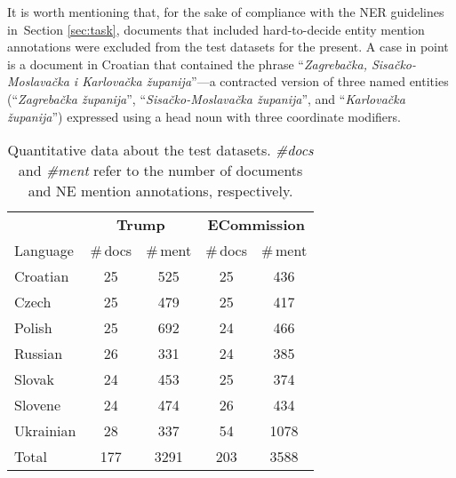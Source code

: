 \documentclass[11pt]{article}
\begin{document}
It is worth mentioning that, for the sake of compliance with the NER guidelines in~Section
\ref{sec:task}, documents that included hard-to-decide entity mention annotations were
excluded from the test datasets for the present.  {A case in point is a document in Croatian
  that contained the phrase ``\textit{Zagrebačka, Sisačko-Moslavačka i Karlovačka
    županija}''---a contracted version of three named entities (``\textit{Zagrebačka
    županija}'', ``\textit{Sisačko-Moslavačka županija}'', and ``\textit{Karlovačka
    županija}'') expressed using a head noun with three coordinate modifiers.}

\begin{table}
  \begin{center}
    \begin{footnotesize}
      \begin{tabular}{lcccc}
        \toprule 
        & \multicolumn{2}{c}{\textbf{{\sc Trump}}} & \multicolumn{2}{c}{\textbf{{\sc ECommission}}} \\
        \cmidrule(lr){2-3}
        \cmidrule(lr){4-5}
        Language &  \#\,docs & \#\,ment & \#\,docs & \#\,ment \\
        \midrule
        Croatian & 25 & 525 & 25 & 436 \\
        Czech & 25 & 479  & 25 & 417 \\
        Polish & 25 & 692  & 24 & 466 \\
        Russian & 26 & 331  & 24 & 385 \\
        Slovak  & 24 & 453  & 25 & 374 \\
        Slovene & 24 & 474  & 26 & 434 \\
        Ukrainian & 28 & 337  & 54 & 1078 \\
        \midrule
        Total & 177 & 3291  & 203 & 3588 \\

        \bottomrule
      \end{tabular}
    \end{footnotesize}
  \end{center}
  \caption{Quantitative data about the test datasets. {\em \#docs} and {\em \#ment} refer to
    the number of documents and NE mention annotations, respectively.} 
  \label{tab:datasets}
\end{table}
\end{document}
